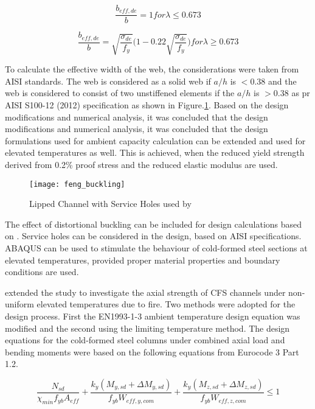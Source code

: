 \begin{equation}
\dfrac{b_{eff,de}}{b}= 1 for \lambda \leq 0.673
\end{equation}

\begin{equation}
\dfrac{b_{eff,de}}{b}= \sqrt{\dfrac{\sigma_{de}}{f_y}}\bigg(1-0.22\sqrt{\dfrac{\sigma_{de}}{f_y}}\bigg) for \lambda \geq 0.673
\end{equation}

To calculate the effective width of the web, the considerations were taken from AISI standards. The web is considered as a solid web if $a/h$ is $< 0.38$ and the web is considered to consist of two unstiffened elements if the $a/h$ is $> 0.38$ as pr AISI S100-12 (2012) specification as shown in Figure.\ref{fig:feng_buckling}. Based on the design modifications and numerical analysis, it was concluded that the design modifications and numerical analysis, it was concluded that the design formulations used for ambient capacity calculation can be extended and used for elevated temperatures as well. This is achieved, when the reduced yield strength derived from 0.2\% proof stress and the reduced elastic modulus are used. 

\begin{figure}[htbp]
	\centering
		\texttt{[image: feng\_buckling]}		
		\caption{Lipped Channel with Service Holes used by \citet{Feng2003}}
		\label{fig:feng_buckling}
\end{figure}

The effect of distortional buckling can be included for design calculations based on \citet{Young1992}. Service holes can be considered in the design, based on AISI specifications. ABAQUS can be used to stimulate the behaviour of cold-formed steel sections at elevated temperatures, provided proper material properties and boundary conditions are used.

\citet{Feng2003} extended the study to investigate the axial strength of CFS channels under non-uniform elevated temperatures due to fire. Two methods were adopted for the design process. First the EN1993-1-3 ambient temperature design equation was modified and the second using the limiting temperature method. The design equations for the cold-formed steel columns under combined axial load and bending moments were based on the following equations from Eurocode 3 Part 1.2.

\begin{equation}
\dfrac{N_{sd}}{\chi_{min}f_{yb}A_{eff}}+\dfrac{k_y(M_{y,sd}+\Delta M_{y,sd})}{f_{yb}W_{eff,y,com}}+\dfrac{k_y(M_{z,sd}+\Delta M_{z,sd})}{f_{yb}W_{eff,z,com}} \leq 1
\end{equation}


